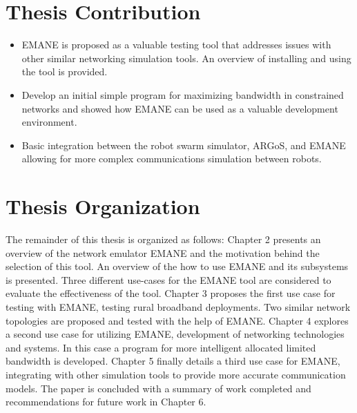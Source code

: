 \section{Thesis Contribution}
\begin{itemize}
    \item EMANE is proposed as a valuable testing tool that addresses issues with other similar networking simulation tools. An overview of installing and using the tool is provided.
    \item Develop an initial simple program for maximizing bandwidth in constrained networks and showed how EMANE can be used as a valuable development environment.
    \item Basic integration between the robot swarm simulator, ARGoS, and EMANE allowing for more complex communications simulation between robots.
\end{itemize}


\section{Thesis Organization}
The remainder of this thesis is organized as follows:
Chapter 2 presents an overview of the network emulator EMANE and the motivation behind the selection of this tool. An overview of the how to use EMANE and its subsystems is presented.
Three different use-cases for the EMANE tool are considered to evaluate the effectiveness of the tool.
Chapter 3 proposes the first use case for testing with EMANE, testing rural broadband deployments. Two similar network topologies are proposed and tested with the help of EMANE.
Chapter 4 explores a second use case for utilizing EMANE, development of networking technologies and systems. In this case a program for more intelligent allocated limited bandwidth is developed.
Chapter 5 finally details a third use case for EMANE, integrating with other simulation tools to provide more accurate communication models.
The paper is concluded with a summary of work completed and recommendations for future work in Chapter 6.
